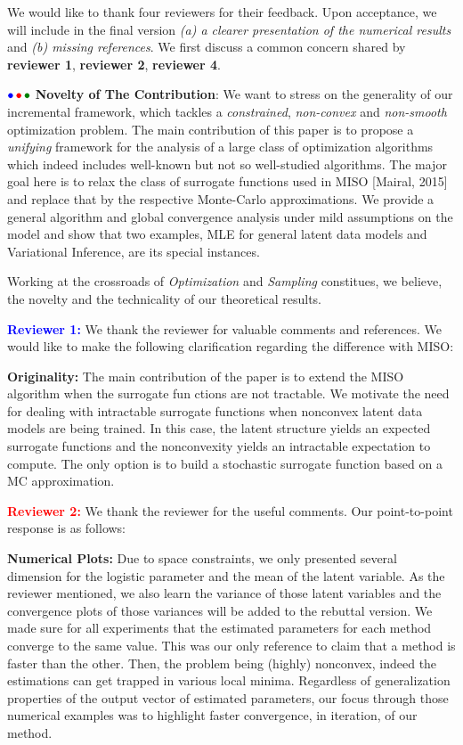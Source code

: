 \documentclass{article}
\begin{document}
We would like to thank four reviewers for their feedback. Upon acceptance, we will include in the final version \emph{{\sf (a)} a clearer presentation of the numerical results} and \emph{{\sf (b)} missing references}. 
We first discuss a common concern shared by \textbf{\color{blue}reviewer 1}, \textbf{\color{red} reviewer 2}, \textbf{\color{green!50!black}reviewer 4}.

${\color{blue}\bullet}\!~{\color{red}\bullet}\!~{\color{green!50!black}\bullet}$ \textbf{Novelty of The Contribution}: 
We want to stress on the generality of our incremental framework, which tackles a \emph{constrained}, \emph{non-convex} and \emph{non-smooth} optimization problem. 
The main contribution of this paper is to propose a \emph{unifying} framework for the analysis of a large class of optimization algorithms which indeed includes well-known but not so well-studied algorithms.
The major goal here is to relax the class of surrogate functions used in MISO [Mairal, 2015] and replace that by the respective Monte-Carlo approximations.
We provide a general algorithm and global convergence analysis under mild assumptions on the model and show that two examples, MLE for general latent data models and Variational Inference, are its special instances.

Working at the crossroads of \emph{Optimization} and \emph{Sampling} constitues, we believe, the novelty and the technicality of our theoretical results.


\textbf{\textcolor{blue}{Reviewer 1:}} We thank the reviewer for valuable comments and references. We would like to make the following clarification regarding the difference with MISO:

\textbf{Originality:} The main contribution of the paper is to extend the MISO algorithm when the surrogate fun
ctions are not tractable. We motivate the need for dealing with intractable surrogate functions when nonconvex latent data models are being trained. In this case, the latent structure yields an expected surrogate functions and the nonconvexity yields an intractable expectation to compute. The only option is to build a stochastic surrogate function based on a MC approximation.


\textbf{\textcolor{red}{Reviewer 2:}} We thank the reviewer for the useful comments. Our point-to-point response is as follows:

\textbf{Numerical Plots:} Due to space constraints, we only presented several dimension for the logistic parameter and the mean of the latent variable. As the reviewer mentioned, we also learn the variance of those latent variables and the convergence plots of those variances will be added to the rebuttal version.
We made sure for all experiments that the estimated parameters for each method converge to the same value. This was our only reference to claim that a method is faster than the other. Then, the problem being (highly) nonconvex, indeed the estimations can get trapped in various local minima. Regardless of generalization properties of the output vector of estimated parameters, our focus through those numerical examples was to highlight faster convergence, in iteration, of our method.
\end{document}
